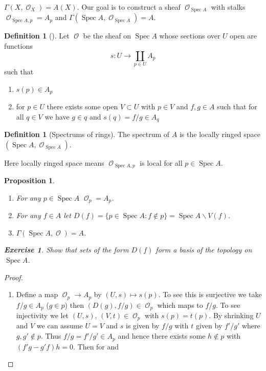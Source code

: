 \documentclass[10pt,]{book}
\theoremstyle{plain}
\newtheorem{proposition}[theorem]{Proposition}
\theoremstyle{definition}
\newtheorem{definition}[theorem]{Definition}
\newtheorem{exercise}[theorem]{Exercise}
\numberwithin{equation}{section}
\DeclareMathOperator{\sO}{\mathcal{O}}
\DeclareMathOperator{\Spec}{Spec}
\begin{document}
          \(\Gamma(X,\sO_X) = A(X)\).
          Our goal is to construct a sheaf \(\sO_{\Spec A}\) with stalks \(\sO_{\Spec A, p} = A_p\) and \(\Gamma(\Spec A, \sO_{\Spec A}) = A\).
\begin{definition}[]\label{definition-4}
Let \(\sO\) be the sheaf on \(\Spec A\) whose sections over \(U\) open are functions \[s\colon U \to \coprod_{p\in U} A_p\]
            such that 
            \begin{enumerate}
\item{}\(s(p)\in A_p\)\item{}for \(p\in U\) there exists some open \(V \subset U\) with \(p\in V\) and \(f,g\in A\) such that for all \(q\in V\) we have \(g\in q\) and \(s(q) = f/g \in A_q\)\end{enumerate}
\end{definition}
\begin{definition}[Spectrums of rings]\label{definition-5}
The spectrum of \(A\) is the locally ringed space \((\Spec A,\sO_{\Spec A})\).\end{definition}
\par
Here locally ringed space means \(\sO_{\Spec A,p}\) is local for all \(p\in \Spec A\).%
\begin{proposition}\label{proposition-1}
\begin{enumerate}
\item{}For any \(p\in \Spec A\) \(\sO_p = A_p\).\item{}For any \(f\in A\) let \(D(f) = \{p\in \Spec A : f\notin p\} = \Spec A \smallsetminus V(f)\).\item{}\(\Gamma(\Spec A,\sO) = A\).\end{enumerate}
\begin{exercise}\label{exercise-3}
Show that sets of the form \(D(f)\) form a basis of the topology on \(\Spec A\).\end{exercise}
\end{proposition}
\begin{proof}
\begin{enumerate}
\item{}Define a map \(\sO_p\to A_p\) by \((U,s)\mapsto s(p)\).
                To see this is surjective we take \(f/g\in A_p\) (\(g\in p\)) then \((D(g),f/g) \in \sO_p\) which maps to \(f/g\).
                To see injectivity we let \((U,s),\,(V,t) \in \sO_p\) with \(s(p) = t(p)\).
                By shrinking \(U\) and \(V\) we can assume \(U = V\) and \(s\) is given by \(f/g\) with \(t\) given by \(f'/g'\) where \(g,g'\notin p\).
                Thus \(f/g = f'/g' \in A_p\) and hence there exists some \(h\notin p\) with \((f'g - g'f)h = 0\).
                Then for and
                
              \end{enumerate}
\end{proof}
\end{document}
